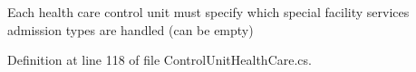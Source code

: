 Each health care control unit must specify which special facility services admission types are handled (can be empty) 



Definition at line 118 of file Control\+Unit\+Health\+Care.\+cs.

